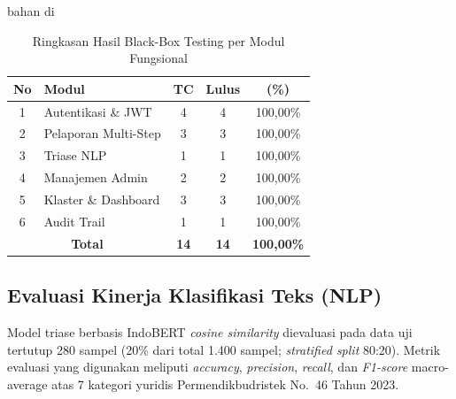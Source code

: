 bahan di\documentclass[conference]{IEEEtran}
\begin{document}
\begin{table}[htbp]
\caption{Ringkasan Hasil Black-Box Testing per Modul Fungsional}
\label{tab:blackbox}
\begin{center}
\begin{tabular}{|c|p{3.0cm}|c|c|c|}
\hline
\textbf{No} & \textbf{Modul} & \textbf{TC} & \textbf{Lulus} & \textbf{(\%)} \\
\hline
1 & Autentikasi \& JWT & 4 & 4 & 100,00\% \\
\hline
2 & Pelaporan Multi-Step & 3 & 3 & 100,00\% \\
\hline
3 & Triase NLP & 1 & 1 & 100,00\% \\
\hline
4 & Manajemen Admin & 2 & 2 & 100,00\% \\
\hline
5 & Klaster \& Dashboard & 3 & 3 & 100,00\% \\
\hline
6 & Audit Trail & 1 & 1 & 100,00\% \\
\hline
\multicolumn{2}{|c|}{\textbf{Total}} & \textbf{14} & \textbf{14} & \textbf{100,00\%} \\
\hline
\end{tabular}
\end{center}
\end{table}

\subsection{Evaluasi Kinerja Klasifikasi Teks (NLP)}

Model triase berbasis IndoBERT \textit{cosine similarity} dievaluasi pada data uji tertutup 280 sampel (20\% dari total 1.400 sampel; \textit{stratified split} 80:20). Metrik evaluasi yang digunakan meliputi \textit{accuracy}, \textit{precision}, \textit{recall}, dan \textit{F1-score} macro-average atas 7 kategori yuridis Permendikbudristek No.~46 Tahun 2023.
\end{document}
